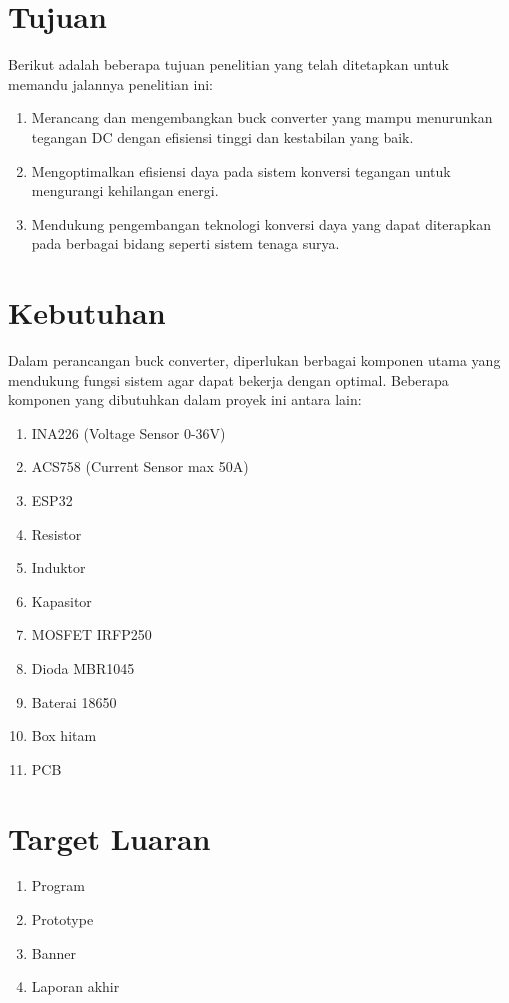 \section{Tujuan }
Berikut adalah beberapa tujuan penelitian yang telah ditetapkan untuk memandu jalannya penelitian ini: 
\begin{enumerate}
    \item Merancang dan mengembangkan buck converter yang mampu menurunkan tegangan DC dengan efisiensi tinggi dan kestabilan yang baik.
    \item Mengoptimalkan efisiensi daya pada sistem konversi tegangan untuk mengurangi kehilangan energi.
    \item Mendukung pengembangan teknologi konversi daya yang dapat diterapkan pada berbagai bidang seperti sistem tenaga surya.
\end{enumerate}

\section{Kebutuhan}
Dalam perancangan buck converter, diperlukan berbagai komponen utama yang mendukung fungsi sistem agar dapat bekerja dengan optimal. Beberapa komponen yang dibutuhkan dalam proyek ini antara lain:
\begin{enumerate}
    \item INA226 (Voltage Sensor 0-36V)
    \item ACS758 (Current Sensor max 50A)
    \item ESP32
    \item Resistor
    \item Induktor
    \item Kapasitor
    \item MOSFET IRFP250
    \item Dioda MBR1045
    \item Baterai 18650
    \item Box hitam
    \item PCB
\end{enumerate}

\section{Target Luaran}
\begin{enumerate}
	\item Program
	\item Prototype
	\item Banner
	\item Laporan akhir
\end{enumerate}

